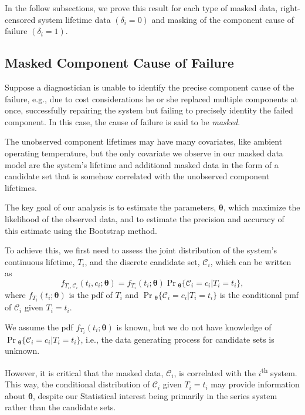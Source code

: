 \documentclass[
]{article}
\begin{document}
In the follow subsections, we prove this result for each type of masked
data, right-censored system lifetime data \((\delta_i = 0)\) and masking
of the component cause of failure \((\delta_i = 1)\).

\hypertarget{sec:candmod}{%
\subsection{Masked Component Cause of Failure}\label{sec:candmod}}

Suppose a diagnostician is unable to identify the precise component
cause of the failure, e.g., due to cost considerations he or she
replaced multiple components at once, successfully repairing the system
but failing to precisely identity the failed component. In this case,
the cause of failure is said to be \emph{masked}.

The unobserved component lifetimes may have many covariates, like
ambient operating temperature, but the only covariate we observe in our
masked data model are the system's lifetime and additional masked data
in the form of a candidate set that is somehow correlated with the
unobserved component lifetimes.

The key goal of our analysis is to estimate the parameters,
\(\boldsymbol{\theta}\), which maximize the likelihood of the observed
data, and to estimate the precision and accuracy of this estimate using
the Bootstrap method.

To achieve this, we first need to assess the joint distribution of the
system's continuous lifetime, \(T_i\), and the discrete candidate set,
\(\mathcal{C}_i\), which can be written as \[
f_{T_i,\mathcal{C}_i}(t_i,c_i;\boldsymbol{\theta}) = f_{T_i}(t_i;\boldsymbol{\theta})
    \Pr{}_{\!\boldsymbol{\theta}}\{\mathcal{C}_i = c_i | T_i = t_i\},
\] where \(f_{T_i}(t_i;\boldsymbol{\theta})\) is the pdf of \(T_i\) and
\(\Pr{}_{\!\boldsymbol{\theta}}\{\mathcal{C}_i = c_i | T_i = t_i\}\) is
the conditional pmf of \(\mathcal{C}_i\) given \(T_i = t_i\).

We assume the pdf \(f_{T_i}(t_i;\boldsymbol{\theta})\) is known, but we
do not have knowledge of
\(\Pr{}_{\!\boldsymbol{\theta}}\{\mathcal{C}_i = c_i | T_i = t_i\}\),
i.e., the data generating process for candidate sets is unknown.

However, it is critical that the masked data, \(\mathcal{C}_i\), is
correlated with the \(i\)\textsuperscript{th} system. This way, the
conditional distribution of \(\mathcal{C}_i\) given \(T_i = t_i\) may
provide information about \(\boldsymbol{\theta}\), despite our
Statistical interest being primarily in the series system rather than
the candidate sets.
\end{document}
